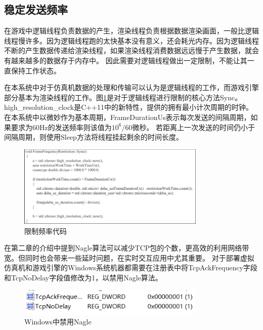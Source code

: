 \subsection{稳定发送频率}
在游戏中逻辑线程负责数据的产生，渲染线程负责根据数据渲染画面，一般比逻辑线程慢许多。因为逻辑线程跑的太快基本没有意义，还会耗光内存。因为逻辑线程不断的产生数据传递给渲染线程，如果渲染线程消费数据远远慢于产生数据，就会有越来越多的数据存于内存中。
因此需要对逻辑线程做出一定限制，不能让其一直保持工作状态。
\par
在本系统中对于仿真机数据的处理和传输可以认为是逻辑线程的工作，而游戏引擎部分基本为渲染线程的工作。图\ref{sync}是对于逻辑线程进行限制的核心方法Sync。
high\_resolution\_clock是C++11中的新特性，提供的拥有最小计次周期的时钟。在本系统中以微妙作为基本周期，FrameDurationUs表示每次发送的间隔周期，如果要求为60Hz的发送频率则该值为$10^6/60$微秒。
若距离上一次发送的时间仍小于间隔周期，则使用Sleep方法将线程挂起剩余的时间长度。
\begin{figure}[h!]
    \begin{center}
        \includegraphics[width=0.8\textwidth]{pictures/code22.pdf}
        \caption{限制频率代码}
        \label{sync}
    \end{center}
\end{figure}
\par
在第二章的介绍中提到Nagle算法可以减少TCP包的个数，更高效的利用网络带宽。但同时也会带来一些延时问题，在实时交互应用中尤其重要。
对于部署虚拟仿真机和游戏引擎的Windows系统机器都需要在注册表中将TcpAckFrequency字段和TcpNoDelay字段值修改为1，以禁用Nagle算法。
\begin{figure}[h!]
    \begin{center}
        \includegraphics[width=0.8\textwidth]{pictures/nagle.png}
        \caption{Windows中禁用Nagle}
    \end{center}
\end{figure}
